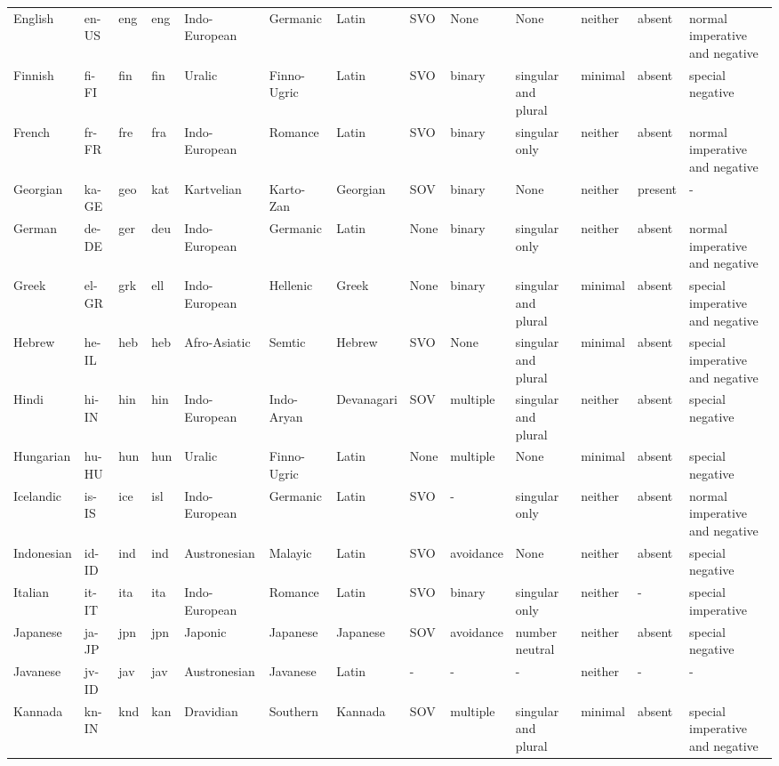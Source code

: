 \documentclass[11pt]{article}
\begin{document}
\begin{table*}[]
{\begin{tabular}{lllllllllllll}
English & en-US & eng & eng & Indo-European & Germanic & Latin & SVO & None & None & neither & absent & normal imperative and negative \\
Finnish & fi-FI & fin & fin & Uralic & Finno-Ugric & Latin & SVO & binary & singular and plural & minimal & absent & special negative \\
French & fr-FR & fre & fra & Indo-European & Romance & Latin & SVO & binary & singular only & neither & absent & normal imperative and negative \\
Georgian & ka-GE & geo & kat & Kartvelian & Karto-Zan & Georgian & SOV & binary & None & neither & present & - \\
German & de-DE & ger & deu & Indo-European & Germanic & Latin & None & binary & singular only & neither & absent & normal imperative and negative \\
Greek & el-GR & grk & ell & Indo-European & Hellenic & Greek & None & binary & singular and plural & minimal & absent & special imperative and negative \\
Hebrew & he-IL & heb & heb & Afro-Asiatic & Semtic & Hebrew & SVO & None & singular and plural & minimal & absent & special imperative and negative \\
Hindi & hi-IN & hin & hin & Indo-European & Indo-Aryan & Devanagari & SOV & multiple & singular and plural & neither & absent & special negative \\
Hungarian & hu-HU & hun & hun & Uralic & Finno-Ugric & Latin & None & multiple & None & minimal & absent & special negative \\
Icelandic & is-IS & ice & isl & Indo-European & Germanic & Latin & SVO & - & singular only & neither & absent & normal imperative and negative \\
Indonesian & id-ID & ind & ind & Austronesian & Malayic & Latin & SVO & avoidance & None & neither & absent & special negative \\
Italian & it-IT & ita & ita & Indo-European & Romance & Latin & SVO & binary & singular only & neither & - & special imperative \\
Japanese & ja-JP & jpn & jpn & Japonic & Japanese & Japanese & SOV & avoidance & number neutral & neither & absent & special negative \\
Javanese & jv-ID & jav & jav & Austronesian & Javanese & Latin & - & - & - & neither & - & - \\
Kannada & kn-IN & knd & kan & Dravidian & Southern & Kannada & SOV & multiple & singular and plural & minimal & absent & special imperative and negative \\

\end{tabular}}
\end{table*}
\end{document}
